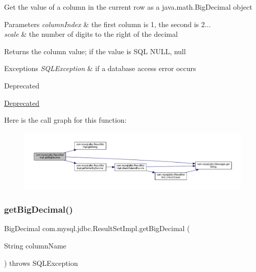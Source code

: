 Get the value of a column in the current row as a java.\+math.\+Big\+Decimal object


\begin{DoxyParams}{Parameters}
{\em column\+Index} & the first column is 1, the second is 2... \\
\hline
{\em scale} & the number of digits to the right of the decimal\\
\hline
\end{DoxyParams}
\begin{DoxyReturn}{Returns}
the column value; if the value is S\+QL N\+U\+LL, null
\end{DoxyReturn}

\begin{DoxyExceptions}{Exceptions}
{\em S\+Q\+L\+Exception} & if a database access error occurs\\
\hline
\end{DoxyExceptions}
\begin{DoxyRefDesc}{Deprecated}
\item[\mbox{\hyperlink{deprecated__deprecated000018}{Deprecated}}]\end{DoxyRefDesc}
Here is the call graph for this function\+:
\nopagebreak
\begin{figure}[H]
\begin{center}
\leavevmode
\includegraphics[width=350pt]{classcom_1_1mysql_1_1jdbc_1_1_result_set_impl_a8e04cde19c0b2817791ffb7a2c8fe576_cgraph}
\end{center}
\end{figure}
\mbox{\label{classcom_1_1mysql_1_1jdbc_1_1_result_set_impl_a0961f23e3e7323a9ca5b31d029cb2b73}} 
\subsubsection{\texorpdfstring{get\+Big\+Decimal()}{getBigDecimal()}\hspace{0.1cm}{\footnotesize\ttfamily [3/4]}}
{\footnotesize\ttfamily Big\+Decimal com.\+mysql.\+jdbc.\+Result\+Set\+Impl.\+get\+Big\+Decimal (\begin{DoxyParamCaption}\item[{String}]{column\+Name }\end{DoxyParamCaption}) throws S\+Q\+L\+Exception}

